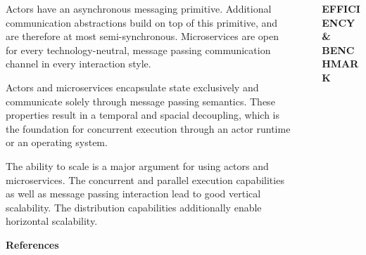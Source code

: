 \documentclass[final,hyperref={pdfpagelabels=true}]{beamer}
\begin{document}
\begin{frame}
\begin{columns}[t]
\begin{column}{.43\textwidth}
{\begin{description}
          \vspace*{1.5\baselineskip}

          \item[\textbf{\textsf{Communication}}] 
          \begin{justify}
          Actors have an asynchronous messaging primitive. Additional communication abstractions build on top of this primitive, and are therefore at most semi-synchronous. Microservices are open for every technology-neutral, message passing communication channel in every interaction style.
          \end{justify}

          \vspace*{1.5\baselineskip}

          \item[\textbf{\textsf{Concurrent Execution}}] 
          \begin{justify}
          Actors and microservices encapsulate state exclusively and communicate solely through message passing semantics. These properties result in a temporal and spacial decoupling, which is the foundation for concurrent execution through an actor runtime or an operating system.
          \end{justify}

          \vspace*{1.5\baselineskip}

          \item[\textbf{\textsf{Scalability}}] 
          \begin{justify}
          The ability to scale is a major argument for using actors and microservices. The concurrent and parallel execution capabilities as well as message passing interaction lead to good vertical scalability. The distribution capabilities additionally enable horizontal scalability.
          \end{justify}
        \end{description}
        
        \vspace*{.7\baselineskip}
        {\footnotesize\textbf{\textsf{References}}}
      }
    \end{column}
    \begin{column}{.06\textwidth}
      \end{column}
    \begin{column}{.43\textwidth}
      \textsf{\textbf{EFFICIENCY \& BENCHMARK}} \\
      \vspace*{.5\baselineskip}
      {\lmodern
        \begin{justify}
        

\end{justify}}
\end{column}
\end{columns}
\end{frame}
\end{document}
